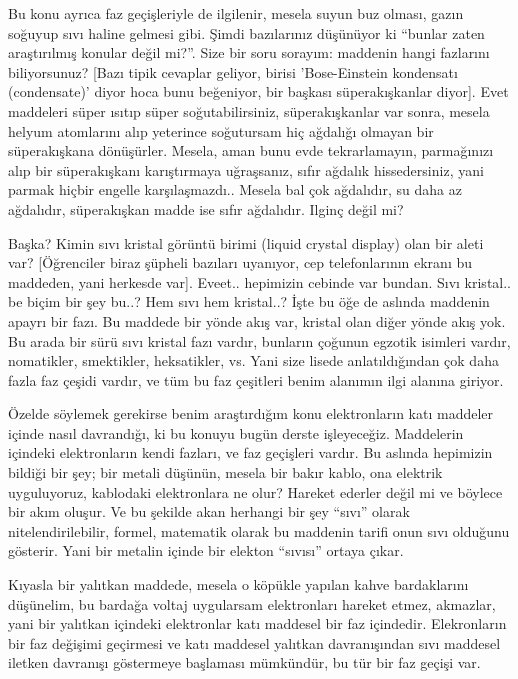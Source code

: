 \documentclass[12pt,fleqn]{article}\usepackage{../../common}
\begin{document}
Bu konu ayrıca faz geçişleriyle de ilgilenir, mesela suyun buz olması, gazın
soğuyup sıvı haline gelmesi gibi. Şimdi bazılarınız düşünüyor ki ``bunlar zaten
araştırılmış konular değil mi?''. Size bir soru sorayım: maddenin hangi
fazlarını biliyorsunuz? [Bazı tipik cevaplar geliyor, birisi 'Bose-Einstein
kondensatı (condensate)' diyor hoca bunu beğeniyor, bir başkası
süperakışkanlar diyor]. Evet maddeleri süper ısıtıp süper soğutabilirsiniz,
süperakışkanlar var sonra, mesela helyum atomlarını alıp yeterince soğutursam
hiç ağdalığı olmayan bir süperakışkana dönüşürler. Mesela, aman bunu evde
tekrarlamayın, parmağınızı alıp bir süperakışkanı karıştırmaya uğraşsanız, sıfır
ağdalık hissedersiniz, yani parmak hiçbir engelle karşılaşmazdı.. Mesela bal çok
ağdalıdır, su daha az ağdalıdır, süperakışkan madde ise sıfır ağdalıdır. Ilginç
değil mi?

Başka? Kimin sıvı kristal görüntü birimi (liquid crystal display) olan bir
aleti var? [Öğrenciler biraz şüpheli bazıları uyanıyor, cep telefonlarının
ekranı bu maddeden, yani herkesde var]. Eveet.. hepimizin cebinde var
bundan. Sıvı kristal.. be biçim bir şey bu..? Hem sıvı hem kristal..? İşte
bu öğe de aslında maddenin apayrı bir fazı. Bu maddede bir yönde akış var,
kristal olan diğer yönde akış yok. Bu arada bir sürü sıvı kristal fazı
vardır, bunların çoğunun egzotik isimleri vardır, nomatikler, smektikler,
heksatikler, vs. Yani size lisede anlatıldığından çok daha fazla faz çeşidi
vardır, ve tüm bu faz çeşitleri benim alanımın ilgi alanına giriyor.

Özelde söylemek gerekirse benim araştırdığım konu elektronların katı
maddeler içinde nasıl davrandığı, ki bu konuyu bugün derste
işleyeceğiz. Maddelerin içindeki elektronların kendi fazları, ve faz
geçişleri vardır. Bu aslında hepimizin bildiği bir şey; bir metali düşünün,
mesela bir bakır kablo, ona elektrik uyguluyoruz, kablodaki elektronlara ne
olur? Hareket ederler değil mi ve böylece bir akım oluşur. Ve bu şekilde
akan herhangi bir şey ``sıvı'' olarak nitelendirilebilir, formel, matematik
olarak bu maddenin tarifi onun sıvı olduğunu gösterir. Yani bir metalin
içinde bir elekton ``sıvısı'' ortaya çıkar.

Kıyasla bir yalıtkan maddede, mesela o köpükle yapılan kahve bardaklarını
düşünelim, bu bardağa voltaj uygularsam elektronları hareket etmez, akmazlar,
yani bir yalıtkan içindeki elektronlar katı maddesel bir faz
içindedir. Elekronların bir faz değişimi geçirmesi ve katı maddesel yalıtkan
davranışından sıvı maddesel iletken davranışı göstermeye başlaması mümkündür, bu
tür bir faz geçişi var.
\end{document}
